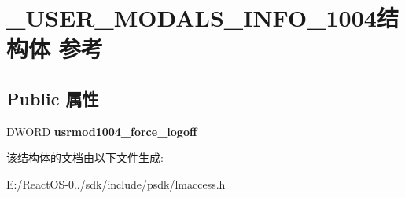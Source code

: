 \hypertarget{struct___u_s_e_r___m_o_d_a_l_s___i_n_f_o__1004}{}\section{\+\_\+\+U\+S\+E\+R\+\_\+\+M\+O\+D\+A\+L\+S\+\_\+\+I\+N\+F\+O\+\_\+1004结构体 参考}
\label{struct___u_s_e_r___m_o_d_a_l_s___i_n_f_o__1004}
\subsection*{Public 属性}
\begin{DoxyCompactItemize}
\item 
\mbox{\label{struct___u_s_e_r___m_o_d_a_l_s___i_n_f_o__1004_ae5213bb3747193f7d6739e26605b938c}} 
D\+W\+O\+RD {\bfseries usrmod1004\+\_\+force\+\_\+logoff}
\end{DoxyCompactItemize}


该结构体的文档由以下文件生成\+:\begin{DoxyCompactItemize}
\item 
E\+:/\+React\+O\+S-\/0../sdk/include/psdk/lmaccess.\+h\end{DoxyCompactItemize}
